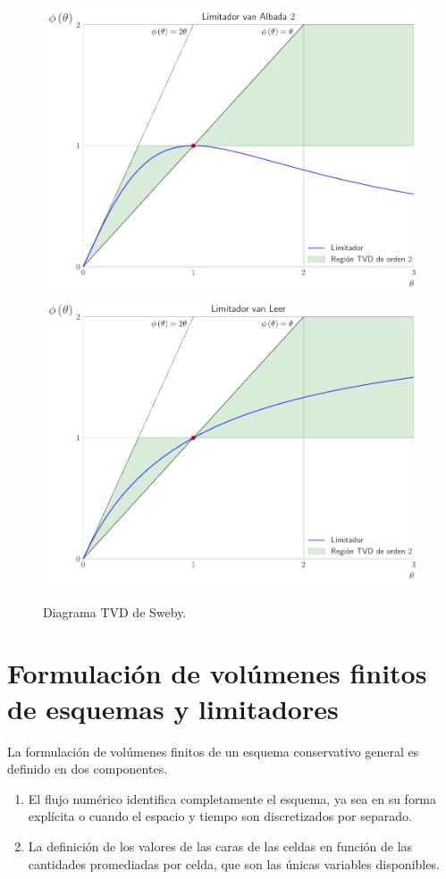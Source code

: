 \begin{figure}[ht!]
	\includegraphics[width=.28\paperwidth]{limiters/limitervanalbada2}
	\includegraphics[width=.28\paperwidth]{limiters/limitervanleer}
	\caption{Diagrama TVD de Sweby.}
	\label{fig:slopelimiters}
\end{figure}

\section{Formulación de volúmenes finitos de esquemas y limitadores}

La formulación de volúmenes finitos de un esquema conservativo general es definido en dos componentes.
\begin{enumerate}
	\item El flujo numérico identifica completamente el esquema, ya sea en su forma explícita o
	      cuando el espacio y tiempo son discretizados por separado.
	\item
	      La definición de los valores de las caras de las celdas en función
	      de las cantidades promediadas por celda, que son las únicas
	      variables disponibles.
\end{enumerate}

